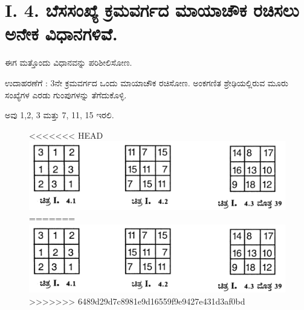 \section*{I. 4. ಬೆಸಸಂಖ್ಯೆ ಕ್ರಮವರ್ಗದ ಮಾಯಾಚೌಕ ರಚಿಸಲು ಅನೇಕ ವಿಧಾನಗಳಿವೆ.}

ಈಗ ಮತ್ತೊಂದು ವಿಧಾನವನ್ನು ಪರಿಶೀಲಿಸೋಣ.

ಉದಾಹರಣೆಗೆ : 3ನೇ ಕ್ರಮವರ್ಗದ ಒಂದು ಮಾಯಾಚೌಕ ರಚಿಸೋಣ. ಅಂಕಗಣಿತ ಶ್ರೇಢಿಯಲ್ಲಿರುವ ಮೂರು ಸಂಖ್ಯೆಗಳ ಎರಡು ಗುಂಪುಗಳನ್ನು ತೆಗೆದುಕೊಳ್ಳಿ.

ಅವು 1,2, 3 ಮತ್ತು 7, 11, 15 ಇರಲಿ.
\begin{figure}[h]
<<<<<<< HEAD
\includegraphics{src/figures/chap3/fig3-9.jpg}
=======
\includegraphics[scale=.9]{src/figures/chap3/fig3.9.jpg}
>>>>>>> 6489d29d7c8981e9d16559f9e9427e431d3af0bd
\end{figure}

